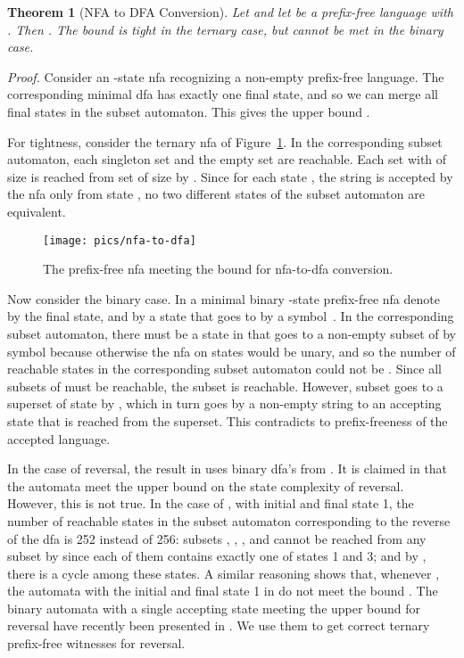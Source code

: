 \documentclass[copyright]{eptcs}
\newtheorem{theorem}{Theorem}
\begin{document}
 \begin{theorem}[NFA to DFA Conversion]\label{thm:nfa-to-dfa}
  Let  and let  be a prefix-free language  with .
  Then .
  The bound is tight in the ternary case,  but cannot be met in the binary case.
 \end{theorem}

 \noindent\emph{Proof.}
  Consider an -state nfa recognizing a non-empty prefix-free language.
  The corresponding minimal dfa has
  exactly one final state,
  and so we can merge all final states in the subset automaton.
  This gives the upper bound .

  For tightness, consider the ternary nfa of Figure~\ref{fig:nfa-to-dfa}.
  In the corresponding subset automaton,
  each singleton set and the empty set are reachable.
  Each set  with 
  of size    is reached from 
  set  of size  by .
  Since for each state , the string 
  is accepted by the nfa only from state ,
  no two different states of the subset automaton are equivalent.

  \begin{figure}[b]
  \centerline{\texttt{[image: pics/nfa-to-dfa]}}
  \caption{The prefix-free  nfa
            meeting the  bound  for nfa-to-dfa conversion.}
  \label{fig:nfa-to-dfa}
  \end{figure}

  Now consider the binary case.
  In a minimal binary -state prefix-free nfa
  denote by   the final state,
  and by  a state that goes to  by a symbol~.
  In the corresponding subset automaton,
  there must be a state  in 
  that goes to a non-empty subset  of   
  by symbol  because otherwise
  the nfa on states  would be unary, and so
  the number of reachable states in the corresponding subset automaton
  could not be .
  Since all subsets of 
  must be reachable, the subset  is reachable.
  However,  subset  goes to a superset of state  by ,
  which in turn goes by a non-empty string  
  to an accepting state that is reached from the superset.
  This contradicts to prefix-freeness of the accepted language.
 \hfill\medskip

  In the case of reversal, the result in \cite{hs09}
  uses  binary dfa's from \cite{swy04}.
  It is claimed in \cite[Theorem~3]{swy04} that 
  the automata meet the upper bound 
  on the state complexity of reversal. However, this is not  true.
  In the case of , with initial and final state 1,
  the number of reachable states in the subset automaton 
  corresponding to the reverse of
  the dfa is 252 instead of 256: subsets 
  , , , and 
  cannot be reached from any subset by  
  since each of them  contains exactly one of states 1 and 3; 
  and by , there is a cycle among these states.
  A similar reasoning shows that, whenever ,
  the automata with the initial and final state 1 in \cite{swy04}
  do not meet the bound .
  The  binary automata with a single accepting state 
  meeting the upper bound for reversal
  have recently been presented in \cite{se10}.
  We use them to get correct ternary prefix-free witnesses for reversal.
\end{document}
